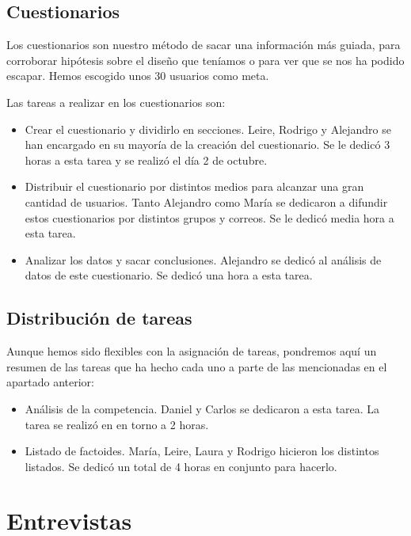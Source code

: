 \subsection{Cuestionarios} \label{subsec:cuestionarios}

Los cuestionarios son nuestro método de sacar una información más guiada, para corroborar hipótesis sobre el diseño que teníamos o para ver que se nos ha podido escapar. Hemos escogido unos 30 usuarios como meta.

Las tareas a realizar en los cuestionarios son:
\begin{itemize}
    \item Crear el cuestionario y dividirlo en secciones. Leire, Rodrigo y Alejandro se han encargado en su mayoría de la creación del cuestionario. Se le dedicó 3 horas a esta tarea y se realizó el día 2 de octubre.
    \item Distribuir el cuestionario por distintos medios para alcanzar una gran cantidad de usuarios. Tanto Alejandro como María se dedicaron a difundir estos cuestionarios por distintos grupos y correos. Se le dedicó media hora a esta tarea.
    \item Analizar los datos y sacar conclusiones. Alejandro se dedicó al análisis de datos de este cuestionario. Se dedicó una hora a esta tarea.
\end{itemize}

\subsection{Distribución de tareas}

Aunque hemos sido flexibles con la asignación de tareas, pondremos aquí un resumen de las tareas que ha hecho cada uno a parte de las mencionadas en el apartado anterior:

\begin{itemize}
    \item Análisis de la competencia. Daniel y Carlos se dedicaron a esta tarea. La tarea se realizó en en torno a 2 horas.
    \item Listado de factoides. María, Leire, Laura  y Rodrigo hicieron los distintos listados. Se dedicó un total de 4 horas en conjunto para hacerlo.
\end{itemize}

\section{Entrevistas}

